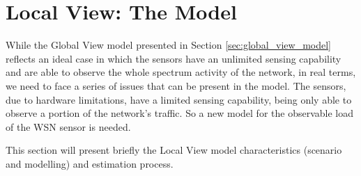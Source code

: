 \section{Local View: The Model} \label{sec:local_view_model}
While the Global View model presented in Section \ref{sec:global_view_model} reflects an ideal case in which the sensors have an unlimited sensing capability and are able to observe the whole spectrum activity of the network, in real terms, we need to face a series of issues that can be present in the model. The sensors, due to hardware limitations, have a limited sensing capability, being only able to observe a portion of the network's traffic. So a new model for the observable load of the \acs{WSN} sensor is needed.

This section will present briefly the Local View model characteristics (scenario and modelling) and estimation process.